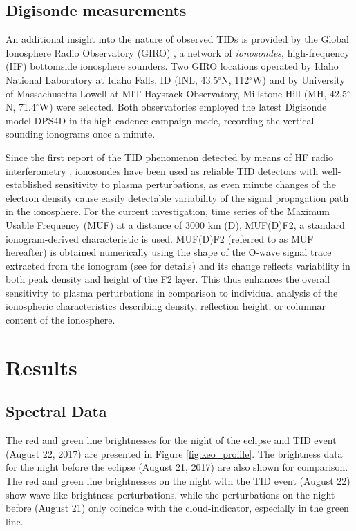 \documentclass[crop=false,class=mitthesis,oneside,font=12pt]{standalone}
\begin{document}
\subsection{Digisonde measurements}
\label{digi_m}

An additional insight into the nature of observed TIDs is provided by the Global Ionosphere Radio Observatory (GIRO) \cite{reinisch2011global}, a network of \textit{ionosondes}, high-frequency (HF) bottomside ionosphere sounders. Two GIRO locations operated by Idaho National Laboratory at Idaho Falls, ID (INL, 43.5$^\circ$N, 112$^\circ$W) and by University of Massachusetts Lowell at MIT Haystack Observatory, Millstone Hill (MH, 42.5$^\circ$N, 71.4$^\circ$W) were selected. Both observatories employed the latest Digisonde model DPS4D \citep{reinisch2009new,digisonde.com} in its high-cadence campaign mode, recording the vertical sounding ionograms once a minute. 
% 
% 

Since the first report of the TID phenomenon detected by means of HF radio interferometry \citep{munro1950travelling}, ionosondes have been used as reliable TID detectors with well-established sensitivity to plasma perturbations, as even minute changes of the electron density cause easily detectable variability of the signal propagation path in the ionosphere. For the current investigation, time series of the Maximum Usable Frequency (MUF) at a distance of 3000 km (D), MUF(D)F2, a standard ionogram-derived characteristic is used. MUF(D)F2 (referred to as MUF hereafter) is obtained numerically using the shape of the O-wave signal trace extracted from the ionogram (see \cite{davies1989ionospheric} for details) and its change reflects variability in both peak density and height of the F2 layer. This thus enhances the overall sensitivity to plasma perturbations in comparison to individual analysis of the ionospheric characteristics describing density, reflection height, or columnar content of the ionosphere.

\section{Results}

\subsection{Spectral Data}
 The red and green line brightnesses for the night of the eclipse and TID event (August 22, 2017) are presented in Figure \ref{fig:keo_profile}. The brightness data for the night before the eclipse (August 21, 2017) are also shown for comparison. The red and green line brightnesses on the night with the TID event (August 22) show wave-like brightness perturbations, while the perturbations on the night before (August 21) only coincide with the cloud-indicator, especially in the green line.
\end{document}
